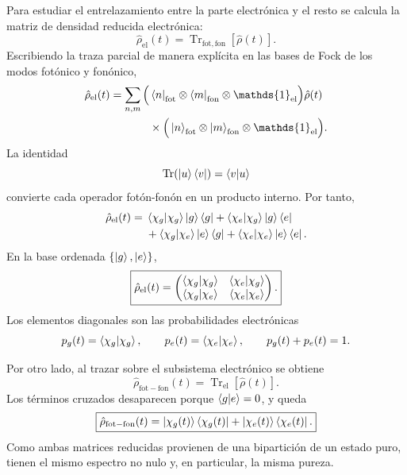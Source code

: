 \documentclass[11pt]{article}
\newcommand{\Id}{\mathds{1}}
\begin{document}
Para estudiar el entrelazamiento entre la parte electr\'onica y el resto se
calcula la matriz de densidad reducida electr\'onica:
\begin{equation}
  \hat\rho_{\mathrm{el}}(t)
  =
  \operatorname{Tr}_{\mathrm{fot,fon}}
  \left[
  \hat\rho(t)
  \right].
\end{equation}
Escribiendo la traza parcial de manera expl\'icita en las bases de Fock de los
modos fot\'onico y fon\'onico,
\begin{equation}
\begin{aligned}
  \hat\rho_{\mathrm{el}}(t)
  =
  \sum_{n,m}
  \Big(&
  \bra n_{\mathrm{fot}}
  \otimes
  \bra m_{\mathrm{fon}}
  \otimes
  \Id_{\mathrm{el}}
  \Big)
  \hat\rho(t)
  \\
  &\times
  \Big(
  \ket n_{\mathrm{fot}}
  \otimes
  \ket m_{\mathrm{fon}}
  \otimes
  \Id_{\mathrm{el}}
  \Big).
\end{aligned}
\end{equation}
La identidad
\begin{equation}
  \operatorname{Tr}(\ket u\bra v)=\braket{v|u}
\end{equation}
convierte cada operador fot\'on-fon\'on en un producto interno. Por tanto,
\begin{equation}
\begin{aligned}
  \hat\rho_{\mathrm{el}}(t)
  ={}&
  \braket{\chi_g|\chi_g}\ket g\bra g
  +
  \braket{\chi_e|\chi_g}\ket g\bra e
  \\
  &+
  \braket{\chi_g|\chi_e}\ket e\bra g
  +
  \braket{\chi_e|\chi_e}\ket e\bra e.
\end{aligned}
\end{equation}
En la base ordenada $\{\ket g,\ket e\}$,
\begin{equation}
  \boxed{
  \hat\rho_{\mathrm{el}}(t)
  =
  \begin{pmatrix}
    \braket{\chi_g|\chi_g} & \braket{\chi_e|\chi_g}
    \\
    \braket{\chi_g|\chi_e} & \braket{\chi_e|\chi_e}
  \end{pmatrix}.
  }
\end{equation}
Los elementos diagonales son las probabilidades electr\'onicas
\begin{equation}
  p_g(t)=\braket{\chi_g|\chi_g},
  \qquad
  p_e(t)=\braket{\chi_e|\chi_e},
  \qquad
  p_g(t)+p_e(t)=1.
\end{equation}

Por otro lado, al trazar sobre el subsistema electr\'onico se obtiene
\begin{equation}
  \hat\rho_{\mathrm{fot-fon}}(t)
  =
  \operatorname{Tr}_{\mathrm{el}}
  \left[
  \hat\rho(t)
  \right].
\end{equation}
Los t\'erminos cruzados desaparecen porque $\braket{g|e}=0$, y queda
\begin{equation}
  \boxed{
  \hat\rho_{\mathrm{fot-fon}}(t)
  =
  \ket{\chi_g(t)}\bra{\chi_g(t)}
  +
  \ket{\chi_e(t)}\bra{\chi_e(t)}.
  }
\end{equation}
Como ambas matrices reducidas provienen de una bipartici\'on de un estado
puro, tienen el mismo espectro no nulo y, en particular, la misma pureza.
\end{document}
